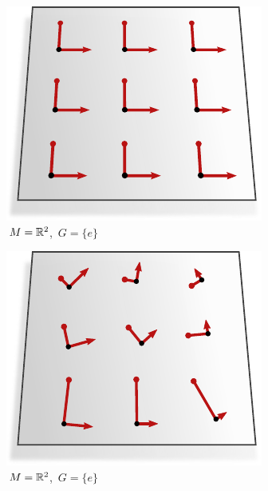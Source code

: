 \begin{subfigure}[b]{0.26\textwidth}
	\centering
	\includegraphics[width=1.\textwidth]{figures/G_structure_R2_1_big.pdf}
	\captionsetup{format=hang}
	\caption{\small
		\,$M = \mathbb{R}^2$,
		\,$G = \{e\}$
	}
	\label{fig:G_structure_intro_a}
\end{subfigure}
\hfill
\begin{subfigure}[b]{0.26\textwidth}
	\centering
	\includegraphics[width=1.\textwidth]{figures/G_structure_R2_5_big.pdf}
	\captionsetup{format=hang}
	\caption{\small
		\,$M = \mathbb{R}^2$,
		\,$G = \{e\}$
	}
	\label{fig:G_structure_intro_b}
\end{subfigure}
